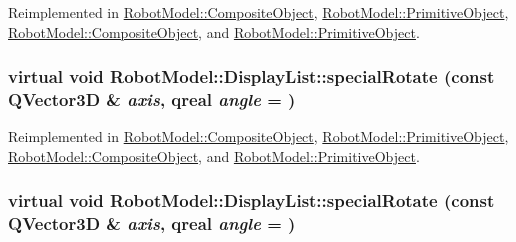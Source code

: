 Reimplemented in \hyperlink{class_robot_model_1_1_composite_object_ae925e59246174c9d3b74d459b32835e3}{RobotModel::CompositeObject}, \hyperlink{class_robot_model_1_1_primitive_object_ae6c417003b52df18a52711031e95c44a}{RobotModel::PrimitiveObject}, \hyperlink{class_robot_model_1_1_composite_object_a6a24e273234d2919c48d36182c409ffd}{RobotModel::CompositeObject}, and \hyperlink{class_robot_model_1_1_primitive_object_a58f3d8655dd442ee1032f3582027604a}{RobotModel::PrimitiveObject}.\hypertarget{class_robot_model_1_1_display_list_abd15964fcf47dbfdcb06d89517871152}{
\subsubsection[{specialRotate}]{\setlength{\rightskip}{0pt plus 5cm}virtual void RobotModel::DisplayList::specialRotate (const QVector3D \& {\em axis}, \/  qreal {\em angle} = {})}}
\label{class_robot_model_1_1_display_list_abd15964fcf47dbfdcb06d89517871152}


Reimplemented in \hyperlink{class_robot_model_1_1_composite_object_ad44b9c1759209367754dafd77c984d6f}{RobotModel::CompositeObject}, \hyperlink{class_robot_model_1_1_primitive_object_a07ece283ed8f0f0e3cdf6f36ac7b34dd}{RobotModel::PrimitiveObject}, \hyperlink{class_robot_model_1_1_composite_object_a3e9c7e78a85dc50e5327d5b5c99cc67e}{RobotModel::CompositeObject}, and \hyperlink{class_robot_model_1_1_primitive_object_a33c01b56d7daf2e1d94419f25b9fa902}{RobotModel::PrimitiveObject}.\hypertarget{class_robot_model_1_1_display_list_abd15964fcf47dbfdcb06d89517871152}{
\subsubsection[{specialRotate}]{\setlength{\rightskip}{0pt plus 5cm}virtual void RobotModel::DisplayList::specialRotate (const QVector3D \& {\em axis}, \/  qreal {\em angle} = {})}}
\label{class_robot_model_1_1_display_list_abd15964fcf47dbfdcb06d89517871152}


